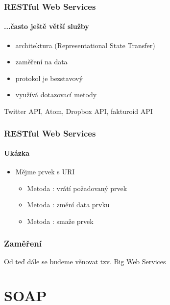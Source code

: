 \documentclass[12pt]{beamer}
\begin{document}
\begin{frame}
  \frametitle{RESTful Web Services}
  \framesubtitle{...často ještě větší služby}
	\begin{itemize}
		\item architektura  (Representational State Transfer)
		\item zaměření na data
		\item protokol je bezstavový
		\item využívá dotazovací metody 
	\end{itemize}
	\begin{example}
		Twitter API, Atom, Dropbox API, fakturoid API
	\end{example}
\end{frame}

\begin{frame}
	\frametitle{RESTful Web Services}
	\framesubtitle{Ukázka}
	\begin{itemize}
		\item Mějme prvek s URI 
		\begin{itemize}
			\item Metoda : vrátí požadovaný prvek
			\item Metoda : změní data prvku
			\item Metoda : smaže prvek
		\end{itemize}
	\end{itemize}
	
\end{frame}

\begin{frame}
  \frametitle{Zaměření}

  \begin{example}
    Od teď dále se budeme věnovat tzv. Big Web Services
  \end{example}
\end{frame}

\section{SOAP}
\end{document}
